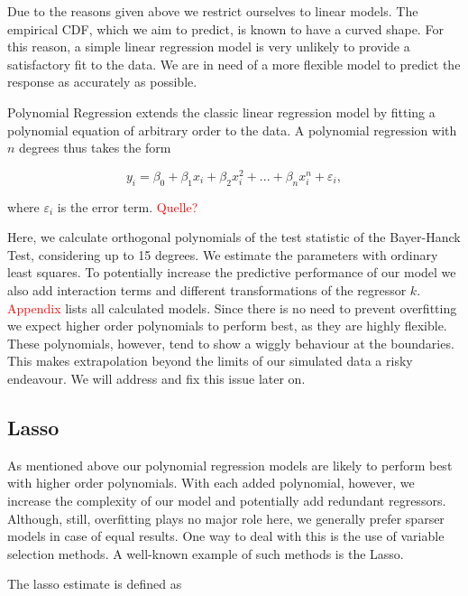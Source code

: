 \documentclass[12pt,a4paper]{article}
\begin{document}
Due to the reasons given above we restrict ourselves to linear models.
The empirical \ac{CDF}, which we aim to predict, is known to have a
curved shape. For this reason, a simple linear regression model is very
unlikely to provide a satisfactory fit to the data. We are in need of a
more flexible model to predict the response as accurately as possible.

Polynomial Regression extends the classic linear regression model by
fitting a polynomial equation of arbitrary order to the data. A
polynomial regression with \(n\) degrees thus takes the form

\begin{equation}
    y_i = \beta_0 + \beta_1 x_i + \beta_2 x_i^2 + ... + \beta_n x_i^n + \varepsilon_i,
\label{eq:6}
\end{equation}

where \(\varepsilon_i\) is the error term. \textcolor{red}{Quelle?}

Here, we calculate orthogonal polynomials of the test statistic of the
Bayer-Hanck Test, considering up to 15 degrees. We estimate the
parameters with ordinary least squares. To potentially increase the
predictive performance of our model we also add interaction terms and
different transformations of the regressor \(k\).
\textcolor{red}{Appendix} lists all calculated models. Since there is no
need to prevent overfitting we expect higher order polynomials to
perform best, as they are highly flexible. These polynomials, however,
tend to show a wiggly behaviour at the boundaries. This makes
extrapolation beyond the limits of our simulated data a risky endeavour.
We will address and fix this issue later on.

\hypertarget{section}{%
\subsection{\texorpdfstring{\ac{Lasso}}{}}\label{section}}

As mentioned above our polynomial regression models are likely to
perform best with higher order polynomials. With each added polynomial,
however, we increase the complexity of our model and potentially add
redundant regressors. Although, still, overfitting plays no major role
here, we generally prefer sparser models in case of equal results. One
way to deal with this is the use of variable selection methods. A
well-known example of such methods is the \ac{Lasso}.

The lasso estimate is defined as
\end{document}
